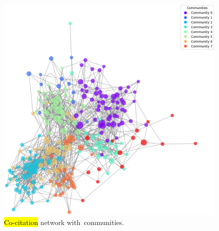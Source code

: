 \documentclass[jmse,review,accept,pdftex,moreauthors]{Definitions/mdpi}
\begin{document}
\begin{figure}[H]

	\includegraphics[width=\linewidth]{pics/cocitation_communiities.eps}
	\caption{\hl{Co-citation} %
 network with~communities.}\label{fig:fig9}
\end{figure}
\end{document}
